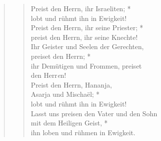 \begin{quote}
\begin{verse}
Preist den Herrn, ihr Israeliten; *\\
lobt und rühmt ihn in Ewigkeit!\\
\vin Preist den Herrn, ihr seine Priester; *\\
\vin preist den Herrn, ihr seine Knechte!\\
Ihr Geister und Seelen der Gerechten,\\
preiset den Herrn; *\\
ihr Demütigen und Frommen, preiset\\ den Herr\textit{e}n!\\
\vin Preist den Herrn, Hananja,\\
\vin Asarja und Mischaël; *\\
\vin lobt und rühmt ihn in Ewigkeit!\\
Lasst uns preisen den Vater und den Sohn\\
mit dem Heiligen Geist, *\\
ihn loben und rühmen in Ewigkeit.\\ 

\end{verse}
\end{quote}

\medskip

{}


\medskip

\def\greinitialformat#1{{\fontsize{40}{40}\selectfont #1}}
\gresetfirstlineaboveinitial{\textcolor{red}{Dan 3}}{}
\setaboveinitialseparation{0.72mm}

\smallskip



